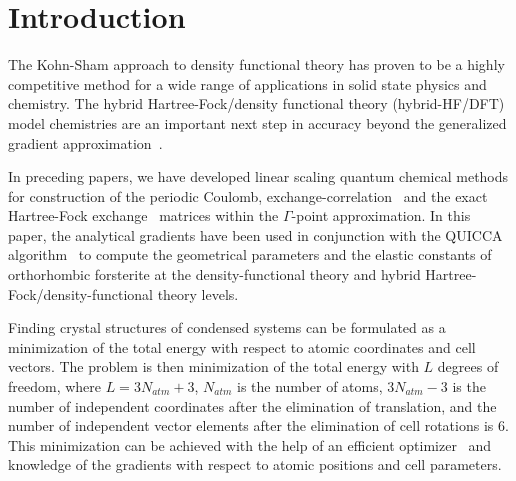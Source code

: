 \documentclass[pra,twocolumn,twocolumngrid,superbib]{revtex4} %
\begin{document}

\maketitle


\section{Introduction}
The Kohn-Sham approach to density functional theory has proven to be a highly
competitive method for a wide range of applications in solid
state physics and chemistry.
The hybrid Hartree-Fock/density functional theory (hybrid-HF/DFT) model chemistries
are an important next step in accuracy beyond the generalized gradient
approximation~\cite{Gill92,Becke93,VBarone96,CAdamo99}.

In preceding papers, we have developed linear scaling quantum chemical methods
for construction of the periodic Coulomb, exchange-correlation~\cite{CTymczak04a}
and the exact Hartree-Fock exchange~\cite{CTymczak04b}
matrices within the $\Gamma$-point approximation.
In this paper, the analytical gradients have been used in conjunction with the
QUICCA algorithm~\cite{KNemeth04} to compute the geometrical parameters and the 
elastic constants of orthorhombic forsterite at the density-functional theory 
and hybrid Hartree-Fock/density-functional theory levels.

Finding crystal structures of condensed systems can
be formulated as a minimization of the total energy
with respect to atomic coordinates and cell vectors.
The problem is then minimization of the total energy with $L$ degrees of freedom, where
$L=3N_{atm}+3$, $N_{atm}$ is the number of atoms, $3N_{atm}-3$ is the number
of independent coordinates after the elimination of translation,
and the number of independent vector elements
after the elimination of cell rotations is 6.
This minimization can be achieved with the help of an
efficient optimizer~\cite{KNemeth04,TBucko05,KNemeth05}
and knowledge of the gradients with respect to atomic
positions and cell parameters.
\end{document}
